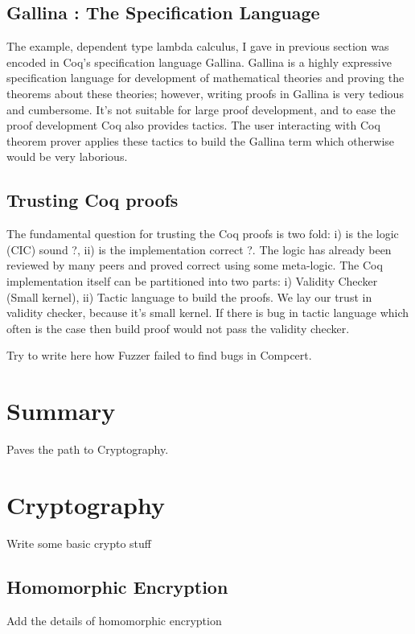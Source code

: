  \subsection{Gallina : The Specification Language}
 \label{sec:gallina}
  The example, dependent type lambda calculus, I gave in previous 
  section was encoded in Coq's specification language Gallina. 
  Gallina is a highly expressive specification 
  language for development of mathematical theories and proving the    
  theorems about these  theories; however, writing proofs in Gallina
  is very tedious and cumbersome. It's not suitable for large proof 
  development, and to ease the proof development Coq also provides 
  tactics.  The user interacting with Coq theorem prover applies these 
  tactics to build the  Gallina term  which otherwise would  
  be very laborious.
  
  
 

 \subsection{Trusting Coq proofs}
 \label{sec:coqproof}
  The fundamental question for trusting the Coq proofs is two fold: 
  i) is the logic (CIC) sound ?, ii) is the implementation correct ?. 
  The logic has already been reviewed by many peers and proved correct 
  using some meta-logic. The 
  Coq implementation itself can be partitioned into two parts: 
  i) Validity Checker (Small kernel), 
  ii) Tactic language to build the proofs.
  We lay our trust in validity checker, because it's small kernel. If there
  is bug in tactic language which often is the case then build proof would 
  not pass the validity checker.  
  
  Try to write here how Fuzzer failed to find bugs in Compcert. 
  
\section{Summary} 
  Paves the path to Cryptography. 
    
\section{Cryptography}
    Write some basic crypto stuff
    
    \subsection{Homomorphic Encryption}
     Add the details of 
     homomorphic encryption 
